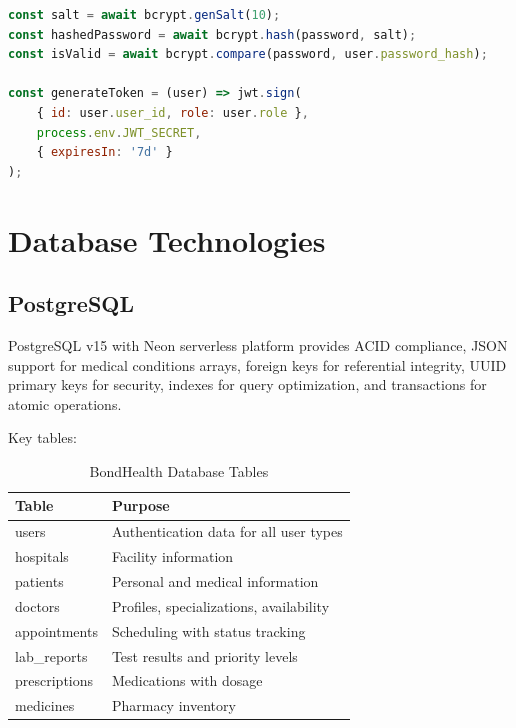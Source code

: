 \begin{lstlisting}[language=JavaScript, caption=Password Hashing and JWT, basicstyle=\ttfamily\small, breaklines=true]
const salt = await bcrypt.genSalt(10);
const hashedPassword = await bcrypt.hash(password, salt);
const isValid = await bcrypt.compare(password, user.password_hash);

const generateToken = (user) => jwt.sign(
    { id: user.user_id, role: user.role },
    process.env.JWT_SECRET,
    { expiresIn: '7d' }
);
\end{lstlisting}

\section{Database Technologies}

\subsection{PostgreSQL}

\justifying
\noindent PostgreSQL v15 with Neon serverless platform provides ACID compliance, JSON support for medical conditions arrays, foreign keys for referential integrity, UUID primary keys for security, indexes for query optimization, and transactions for atomic operations.

\noindent Key tables:

\begin{table}[H]
\centering
\begin{tabular}{|l|p{8cm}|}
\hline
\textbf{Table} & \textbf{Purpose} \\
\hline
users & Authentication data for all user types \\
\hline
hospitals & Facility information \\
\hline
patients & Personal and medical information \\
\hline
doctors & Profiles, specializations, availability \\
\hline
appointments & Scheduling with status tracking \\
\hline
lab\_reports & Test results and priority levels \\
\hline
prescriptions & Medications with dosage \\
\hline
medicines & Pharmacy inventory \\
\hline
\end{tabular}
\caption{BondHealth Database Tables}
\label{tab:tables}
\end{table}

